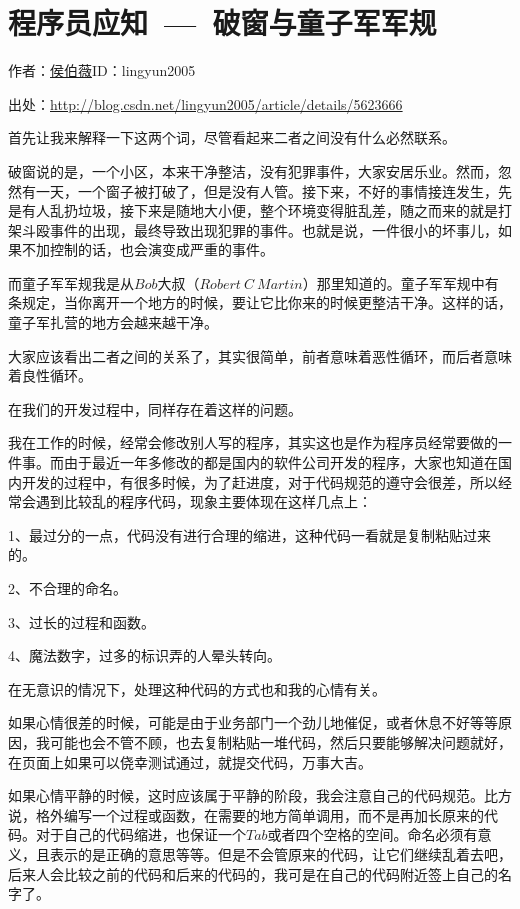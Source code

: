 \chapter{程序员应知~—~破窗与童子军军规}


\begin{center}
作者：\href{http://www.cnblogs.com/houbowei/}{侯伯薇}\qquad ID：lingyun2005\cite{broken_window}
\end{center}

出处：\url{http://blog.csdn.net/lingyun2005/article/details/5623666}

首先让我来解释一下这两个词，尽管看起来二者之间没有什么必然联系。

破窗说的是，一个小区，本来干净整洁，没有犯罪事件，大家安居乐业。然而，忽然有一天，一个窗子被打破了，但是没有人管。接下来，不好的事情接连发生，先是有人乱扔垃圾，接下来是随地大小便，整个环境变得脏乱差，随之而来的就是打架斗殴事件的出现，最终导致出现犯罪的事件。也就是说，一件很小的坏事儿，如果不加控制的话，也会演变成严重的事件。

而童子军军规我是从$Bob$大叔（$Robert\  C\  Martin$）那里知道的。童子军军规中有条规定，当你离开一个地方的时候，要让它比你来的时候更整洁干净。这样的话，童子军扎营的地方会越来越干净。

大家应该看出二者之间的关系了，其实很简单，前者意味着恶性循环，而后者意味着良性循环。

在我们的开发过程中，同样存在着这样的问题。

我在工作的时候，经常会修改别人写的程序，其实这也是作为程序员经常要做的一件事。而由于最近一年多修改的都是国内的软件公司开发的程序，大家也知道在国内开发的过程中，有很多时候，为了赶进度，对于代码规范的遵守会很差，所以经常会遇到比较乱的程序代码，现象主要体现在这样几点上：

1、最过分的一点，代码没有进行合理的缩进，这种代码一看就是复制粘贴过来的。

2、不合理的命名。

3、过长的过程和函数。

4、魔法数字，过多的标识弄的人晕头转向。

在无意识的情况下，处理这种代码的方式也和我的心情有关。

如果心情很差的时候，可能是由于业务部门一个劲儿地催促，或者休息不好等等原因，我可能也会不管不顾，也去复制粘贴一堆代码，然后只要能够解决问题就好，在页面上如果可以侥幸测试通过，就提交代码，万事大吉。

如果心情平静的时候，这时应该属于平静的阶段，我会注意自己的代码规范。比方说，格外编写一个过程或函数，在需要的地方简单调用，而不是再加长原来的代码。对于自己的代码缩进，也保证一个$Tab$或者四个空格的空间。命名必须有意义，且表示的是正确的意思等等。但是不会管原来的代码，让它们继续乱着去吧，后来人会比较之前的代码和后来的代码的，我可是在自己的代码附近签上自己的名字了。

